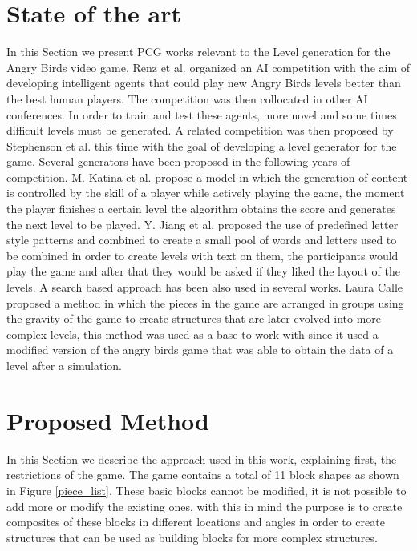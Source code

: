 \documentclass[conference]{IEEEtran}
\begin{document}
    
    \section{State of the art}
    \label{SoA}
    In this Section we present PCG works relevant to the Level generation for the
    Angry Birds video game. Renz et al. \cite{Renz, Renz2015TheAB} organized an AI
    competition with the aim of developing intelligent agents that could play new
    Angry Birds levels better than the best human players. The competition was then
    collocated in other AI conferences. In order to train and test these agents,
    more novel and some times difficult levels must be generated. A related
    competition was then proposed by Stephenson et al. \cite{Stephenson} this time
    with the goal of developing a level generator for the game. Several generators
    have been proposed in the following years of competition. M. Katina et al.
    \cite{Kaidan2015} propose a model in which the generation of content is
    controlled by the skill of a player while actively playing the game, the moment
    the player finishes a certain level the algorithm obtains the score and
    generates the next level to be played. Y. Jiang et al. \cite{Jiang2017} proposed
    the use of predefined letter style patterns and combined to create a small pool
    of words and letters used to be combined in order to create levels with text on
    them, the participants would play the game and after that they would be asked if
    they liked the layout of the levels. A search based approach has been also used
    in several works. Laura Calle \cite{lauracalle} proposed a method in which the 
    pieces in the game are arranged in groups using the gravity of the game to 
    create structures that are later evolved into more complex levels, this method 
    was used as a base to work with since it used a modified version of the angry 
    birds game that was able to obtain the data of a level after a simulation.
    
    \section{Proposed Method}
    
    In this Section we describe the approach used in this work, explaining first,
    the restrictions of the game.
    The game contains a total of 11 block shapes as shown in Figure \ref{piece_list}.
    These basic blocks cannot be modified, it is not possible to add more or modify the existing ones,
    with this in mind the purpose is to create composites of these blocks in
    different locations and angles in order to create structures that can be used as
    building blocks for more complex structures. 
    
\end{document}
